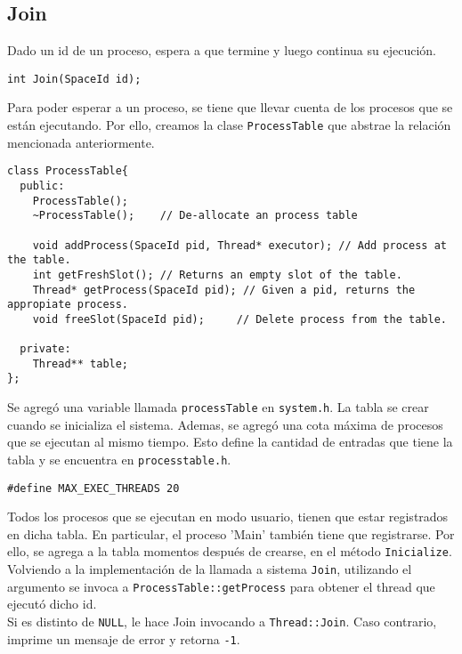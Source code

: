 \subsection*{Join}
Dado un id de un proceso, espera a que termine y luego continua su ejecución.
\begin{lstlisting}[style=C]
int Join(SpaceId id);
\end{lstlisting}
Para poder esperar a un proceso, se tiene que llevar cuenta de los procesos que se están ejecutando. Por ello, creamos la clase \texttt{ProcessTable} que abstrae la relación mencionada anteriormente.
\begin{lstlisting}[style=C]
class ProcessTable{
  public:
    ProcessTable();
    ~ProcessTable();	// De-allocate an process table

    void addProcess(SpaceId pid, Thread* executor); // Add process at the table.
    int getFreshSlot(); // Returns an empty slot of the table.
    Thread* getProcess(SpaceId pid); // Given a pid, returns the appropiate process.
    void freeSlot(SpaceId pid);		// Delete process from the table.

  private:
    Thread** table;
};
\end{lstlisting}
Se agregó una variable llamada \texttt{processTable} en \texttt{system.h}. La tabla se crear cuando se inicializa el sistema. Ademas, se agregó una cota máxima de procesos que se ejecutan al mismo tiempo. Esto define la cantidad de entradas que tiene la tabla y se encuentra en \texttt{processtable.h}.
\begin{lstlisting}[style=C]
#define MAX_EXEC_THREADS 20
\end{lstlisting}
Todos los procesos que se ejecutan en modo usuario, tienen que estar registrados en dicha tabla. En particular, el proceso 'Main' también tiene que registrarse. Por ello, se agrega a la tabla momentos después de crearse, en el método \texttt{Inicialize}.\\
Volviendo a la implementación de la llamada a sistema \texttt{Join}, utilizando el argumento se invoca a \texttt{ProcessTable::getProcess} para obtener el thread que ejecutó dicho id.\\
Si es distinto de \texttt{NULL}, le hace Join invocando a \texttt{Thread::Join}. Caso contrario, imprime un mensaje de error y retorna \texttt{-1}.
